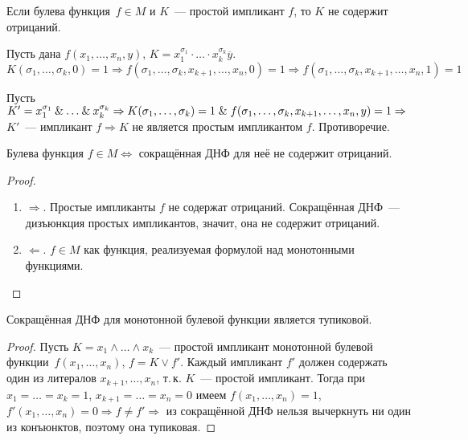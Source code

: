 \begin{theorem}
Если булева функция~$f \in M$ и $K$~--- простой импликант $f$, то $K$ не содержит отрицаний.
\end{theorem}
\begin{proofcontra}
Пусть дана $f(x_1, \ldots, x_n, y)$, $K = x_1^{\sigma_1} \cdot \ldots \cdot x_k^{\sigma_k} \overline y$.
\begin{equation*}
K(\sigma_1, \ldots, \sigma_k, 0) = 1 \Rightarrow
f(\sigma_1, \ldots, \sigma_k, x_{k+1}, \ldots, x_n, 0) = 1 \Rightarrow
f(\sigma_1, \ldots, \sigma_k, x_{k+1}, \ldots, x_n, 1) = 1
\end{equation*}

Пусть $K' = x_1^{\sigma_1} \mathbin{\&} \ldots \mathbin{\&} x_k^{\sigma_k} \Rightarrow
K(\sigma_1, \ldots, \sigma_k) = 1 \mathrel{\&} f(\sigma_1, \ldots, \sigma_k, x_{k+1}, \ldots, x_n, y) = 1 \Rightarrow$ $K'$~--- импликант $f \Rightarrow K$ не является простым импликантом $f$.
Противоречие.
\end{proofcontra}

\begin{theorem}
Булева функция $f \in M \Leftrightarrow$ сокращённая ДНФ для неё не содержит отрицаний.
\end{theorem}
\begin{proof}
\begin{enumerate}
	\item $\Rightarrow$. Простые импликанты $f$ не содержат отрицаний.
	Сокращённая ДНФ~--- дизъюнкция простых импликантов, значит, она не содержит отрицаний.
	\item $\Leftarrow$. $f \in M$ как функция, реализуемая формулой над монотонными функциями.
\end{enumerate}
\end{proof}

\begin{theorem}
Сокращённая ДНФ для монотонной булевой функции является тупиковой.
\end{theorem}
\begin{proof}
Пусть $K = x_1 \land \ldots \land x_k$~--- простой импликант монотонной булевой функции~$f(x_1, \ldots, x_n)$, $f = K \lor f'$.
Каждый импликант $f'$ должен содержать один из литералов $x_{k+1}, \ldots, x_n$, т.\,к. $K$~--- простой импликант.
Тогда при $x_1 = \ldots = x_k = 1$, $x_{k+1} = \ldots = x_n = 0$ имеем $f(x_1, \ldots, x_n) = 1$, $f'(x_1, \ldots, x_n) = 0 \Rightarrow f \neq f' \Rightarrow$ из сокращённой ДНФ нельзя вычеркнуть ни один из конъюнктов, поэтому она тупиковая.
\end{proof}

